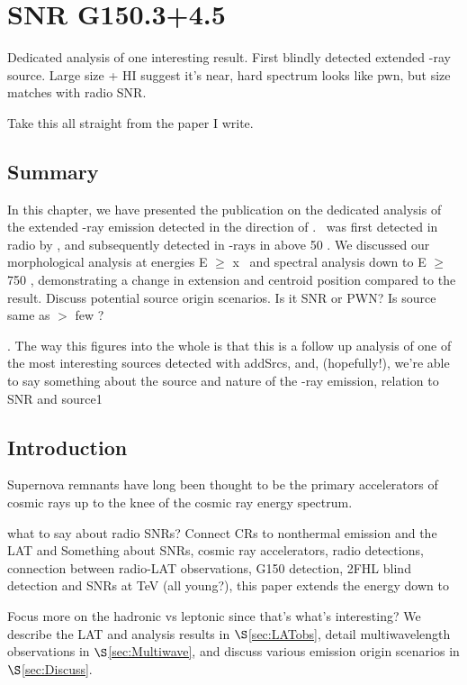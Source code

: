 \chapter{SNR G150.3+4.5}
\label{chap:G150}
Dedicated analysis  of one interesting \twofhl result. First blindly detected extended \g -ray source. Large size  + HI suggest it's near, hard spectrum looks like pwn, but size matches with radio SNR.

Take this all straight from the paper I write.


\section{\label{G150:summ}Summary} In this chapter, we have presented the publication on the dedicated analysis of the extended \g -ray emission detected in the direction of \Gone. \Gone ~was first detected in radio by \cite{Gao14}, and subsequently detected in \g-rays in \twofhl above 50 \gev. We discussed our \lat morphological analysis at energies E $\geq$ x \gev~and spectral analysis down to E $\geq$ 750 \mev, demonstrating a change in extension and centroid position compared to the \twofhl result. Discuss potential source origin scenarios. Is it SNR or PWN? Is \twofhl source same as $>$ few \gev? 

. The way this figures into the whole is that  this is a follow up analysis of one of the most interesting  sources detected with addSrcs, and, (hopefully!), we're able to say something about the source and nature of the \g-ray emission, relation to SNR and \twofhl source1

\section{Introduction} 
Supernova remnants have long been thought to be the primary accelerators of cosmic rays up to the knee of the cosmic ray energy spectrum. 

what to say about radio SNRs? Connect CRs to nonthermal emission and the LAT and 
Something about SNRs, cosmic ray accelerators, radio detections, connection between radio-LAT observations, G150 detection, 2FHL blind detection and SNRs at TeV (all young?), this paper extends the energy down to

Focus more on the hadronic vs leptonic since that's what's interesting? 
We describe the LAT and analysis results in $\S$\ref{sec:LATobs}, detail multiwavelength observations in $\S$\ref{sec:Multiwave}, and discuss various emission origin scenarios in $\S$\ref{sec:Discuss}.
%
%
